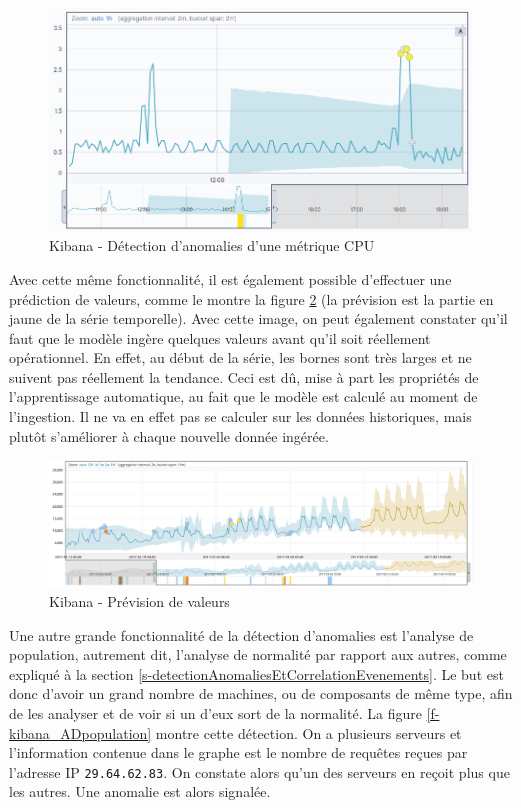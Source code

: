\documentclass[paper=a4, fontsize=11pt]{scrartcl}
\begin{document}
\begin{figure}[H]
    \centering
    \includegraphics[width=18cm]{img/screenshots/AD_elastic_without_forecast.png}
    \caption{Kibana - Détection d'anomalies d'une métrique CPU}
    \label{f-kibana_ADsingleMetric}
\end{figure}

Avec cette même fonctionnalité, il est également possible d'effectuer une prédiction de valeurs, comme le montre la figure \ref{f-kibana_forecasting} (la prévision est la partie en jaune de la série temporelle). Avec cette image, on peut également constater qu'il faut que le modèle ingère quelques valeurs avant qu'il soit réellement opérationnel. En effet, au début de la série, les bornes sont très larges et ne suivent pas réellement la tendance. Ceci est dû, mise à part les propriétés de l'apprentissage automatique, au fait que le modèle est calculé au moment de l'ingestion. Il ne va en effet pas se calculer sur les données historiques, mais plutôt s'améliorer à chaque nouvelle donnée ingérée.

\begin{figure}[H]
    \centering
    \includegraphics[width=18cm]{img/elastic_forecasting.png}
    \caption{Kibana - Prévision de valeurs \cite{noauthor_-demand_2018}}
    \label{f-kibana_forecasting}
\end{figure}

Une autre grande fonctionnalité de la détection d'anomalies est l'analyse de population, autrement dit, l'analyse de normalité par rapport aux autres, comme expliqué à la section \ref{s-detectionAnomaliesEtCorrelationEvenements}. Le but est donc d'avoir un grand nombre de machines, ou de composants de même type, afin de les analyser et de voir si un d'eux sort de la normalité. La figure \ref{f-kibana_ADpopulation} montre cette détection. On a plusieurs serveurs et l'information contenue dans le graphe est le nombre de requêtes reçues par l'adresse IP \verb,29.64.62.83,. On constate alors qu'un des serveurs en reçoit plus que les autres. Une anomalie est alors signalée.
\end{document}
